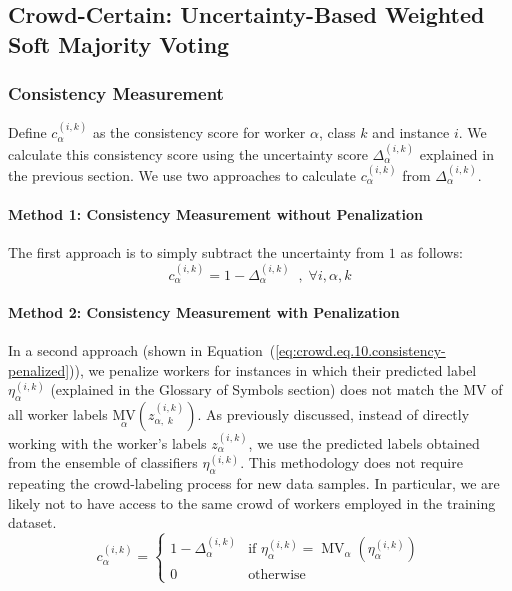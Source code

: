 \documentclass[sn-nature]{bst/sn-jnl}
\begin{document}
\subsection{Crowd-Certain: Uncertainty-Based Weighted Soft Majority Voting}
\subsubsection{Consistency Measurement}
Define $c_{\alpha}^{(i,k)} $ as the consistency score for worker $\alpha $, class $k $ and instance $i $. We calculate this consistency score using the uncertainty score $\Delta_{\alpha}^{(i,k)} $ explained in the previous section. We use two approaches to calculate $c_{\alpha}^{(i,k)} $ from $\Delta_{\alpha}^{(i,k)} $.
%
\paragraph*{Method 1: Consistency Measurement without Penalization}
The first approach is to simply subtract the uncertainty from $1 $ as follows:
\begin{equation}
    c_{\alpha}^{(i,k)}=1-\Delta_{\alpha}^{(i,k)}\;\;,\;\forall i,\alpha,k
    \label{eq:crowd.Eq.9.consistency}%
\end{equation}
%
\paragraph*{Method 2: Consistency Measurement with Penalization}
In a second approach (shown in Equation~(\ref{eq:crowd.eq.10.consistency-penalized})), we penalize workers for instances in which their predicted label $\eta_{\alpha}^{(i,k)} $ (explained in the Glossary of Symbols section) does not match the MV of all worker labels ${{\underset \alpha{\mathrm{MV}}}{\left(z_{\alpha,\;k}^{(i,k)}\right)}} $. As previously discussed, instead of directly working with the worker's labels $z_{\alpha}^{(i,k)} $, we use the predicted labels obtained from the ensemble of classifiers $\eta_{\alpha}^{(i,k)} $. This methodology does not require repeating the crowd-labeling process for new data samples. In particular, we are likely not to have access to the same crowd of workers employed in the training dataset.
\begin{equation}
    c_{\alpha}^{(i,k)} =
    \begin{cases}
        1 - \Delta_{\alpha}^{(i,k)} & \text{if } \eta_{\alpha}^{(i,k)} = \operatorname{MV}_{\alpha}(\eta_{\alpha}^{(i,k)}) \\
        0 & \text{otherwise}
    \end{cases}
    \label{eq:crowd.eq.10.consistency-penalized}
\end{equation}
%
\end{document}
